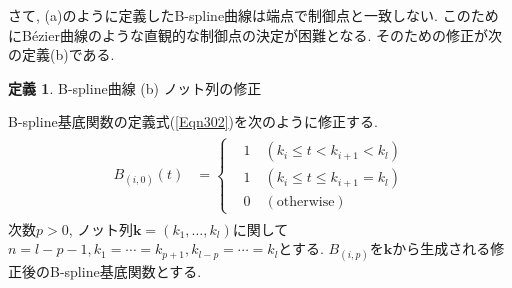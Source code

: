 \documentclass{jsarticle}
\theoremstyle{definition}%
\newtheorem{defn}[thm]{定義}
\begin{document}


\newpage
さて, (a)のように定義したB-spline曲線は端点で制御点と一致しない.
このためにB\'{e}zier曲線のような直観的な制御点の決定が困難となる.
そのための修正が次の定義(b)である.
\begin{screen}
	\begin{defn}
        \label{Def300b}
		B-spline曲線 (b) ノット列の修正

        B-spline基底関数の定義式(\ref{Eqn302})を次のように修正する.
        \begin{align}
            \label{Eqn310}
            \begin{aligned}
                {B}_{(i,0)} (t)
                &=
                \begin{cases}
                    &1\quad (k_{i}\le t<k_{i+1}<k_{l})\\
                    &1\quad (k_{i}\le t\le k_{i+1}=k_{l})\\
                    &0\quad (\text{otherwise})
                \end{cases}
            \end{aligned}
        \end{align}
        次数$p>0$, ノット列$\bm{k}=(k_1,\dots,k_l)$に関して$n=l-p-1, k_{1}=\cdots=k_{p+1}, k_{l-p}=\cdots=k_{l}$とする.
        $B_{(i,p)}$を$\bm{k}$から生成される修正後のB-spline基底関数とする.


\end{defn}
\end{screen}
\end{document}
